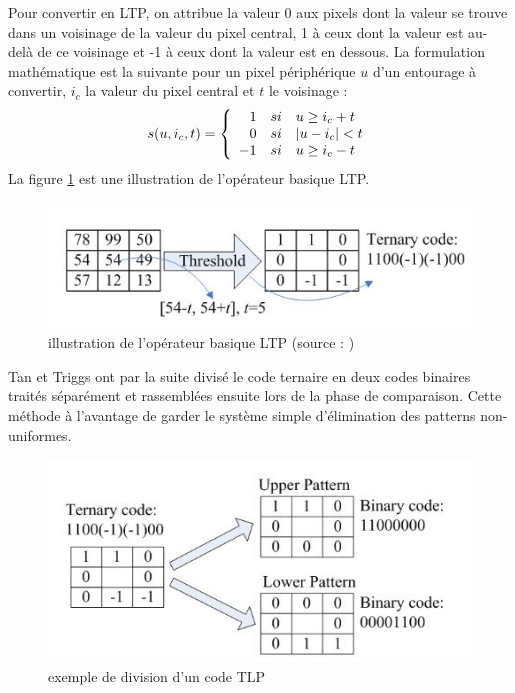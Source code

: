 Pour convertir en LTP, on attribue la valeur 0 aux pixels dont la valeur se trouve
dans un voisinage de la valeur du pixel central, 1 à ceux dont la valeur est au-delà de
ce voisinage et -1 à ceux dont la valeur est en dessous. La formulation mathématique
est la suivante pour un pixel périphérique $u$ d'un entourage à convertir, $i_c$ la valeur du pixel central et $t$ le voisinage : 
\[
s(u,i_c,t)=\left\{
\begin{array}{r c l}
1 &si& u\geq i_c + t\\
0 &si& \left|u-i_c\right|< t\\
-1 &si& u\geq i_c-t
\end{array}
\right.
\]
La figure \ref{fig:ltp} est une illustration de l'opérateur basique LTP.
\begin{figure}[htbp]
	\centering
		\includegraphics{ltp.JPG}
	\caption[illustration de l'opérateur basique LTP]{illustration de l'opérateur basique LTP (source : \cite{TAN})}
	\label{fig:ltp}
\end{figure}
Tan et Triggs ont par la suite divisé le code ternaire en deux codes binaires traités séparément et rassemblées ensuite lors de la phase de comparaison. Cette méthode à l'avantage de garder le système simple d'élimination
des patterns non-uniformes.
\begin{figure}[htbp]
	\centering
		\includegraphics{tlpdivise.JPG}
	\caption{exemple de division d'un code TLP}
	\label{fig:tlp divise}
\end{figure}
